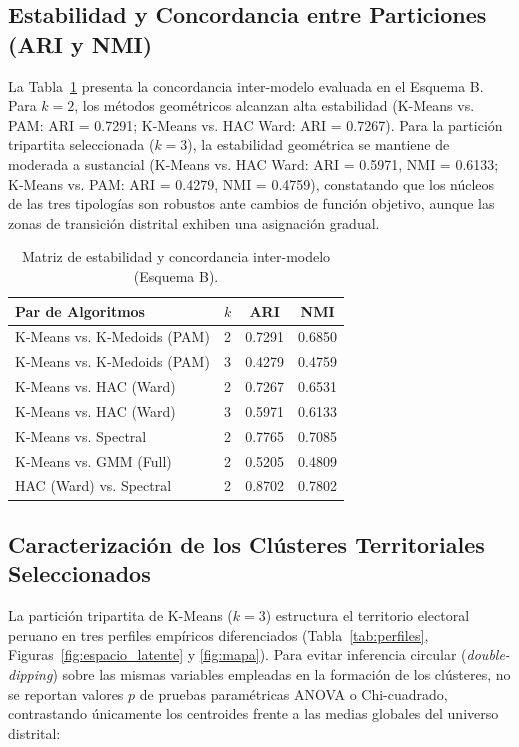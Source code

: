 \documentclass[conference,10pt,letterpaper]{IEEEtran}
\begin{document}
\subsection{Estabilidad y Concordancia entre Particiones (ARI y NMI)}

La Tabla~\ref{tab:estabilidad} presenta la concordancia inter-modelo evaluada en el Esquema B. Para $k = 2$, los métodos geométricos alcanzan alta estabilidad (K-Means vs. PAM: ARI = 0.7291; K-Means vs. HAC Ward: ARI = 0.7267). Para la partición tripartita seleccionada ($k = 3$), la estabilidad geométrica se mantiene de moderada a sustancial (K-Means vs. HAC Ward: ARI = 0.5971, NMI = 0.6133; K-Means vs. PAM: ARI = 0.4279, NMI = 0.4759), constatando que los núcleos de las tres tipologías son robustos ante cambios de función objetivo, aunque las zonas de transición distrital exhiben una asignación gradual.

\begin{table}[htbp]
\centering
\caption{Matriz de estabilidad y concordancia inter-modelo (Esquema B).}
\label{tab:estabilidad}
\footnotesize
\begin{tabularx}{\columnwidth}{l c c c}
\toprule
\textbf{Par de Algoritmos} & \textbf{$k$} & \textbf{ARI} & \textbf{NMI} \\
\midrule
K-Means vs. K-Medoids (PAM) & 2 & 0.7291 & 0.6850 \\
K-Means vs. K-Medoids (PAM) & 3 & 0.4279 & 0.4759 \\
K-Means vs. HAC (Ward) & 2 & 0.7267 & 0.6531 \\
K-Means vs. HAC (Ward) & 3 & 0.5971 & 0.6133 \\
K-Means vs. Spectral & 2 & 0.7765 & 0.7085 \\
K-Means vs. GMM (Full) & 2 & 0.5205 & 0.4809 \\
HAC (Ward) vs. Spectral & 2 & 0.8702 & 0.7802 \\
\bottomrule
\end{tabularx}
\end{table}

\subsection{Caracterización de los Clústeres Territoriales Seleccionados}

La partición tripartita de K-Means ($k = 3$) estructura el territorio electoral peruano en tres perfiles empíricos diferenciados (Tabla~\ref{tab:perfiles}, Figuras~\ref{fig:espacio_latente} y \ref{fig:mapa}). Para evitar inferencia circular (\textit{double-dipping}) sobre las mismas variables empleadas en la formación de los clústeres, no se reportan valores $p$ de pruebas paramétricas ANOVA o Chi-cuadrado, contrastando únicamente los centroides frente a las medias globales del universo distrital:
\end{document}
